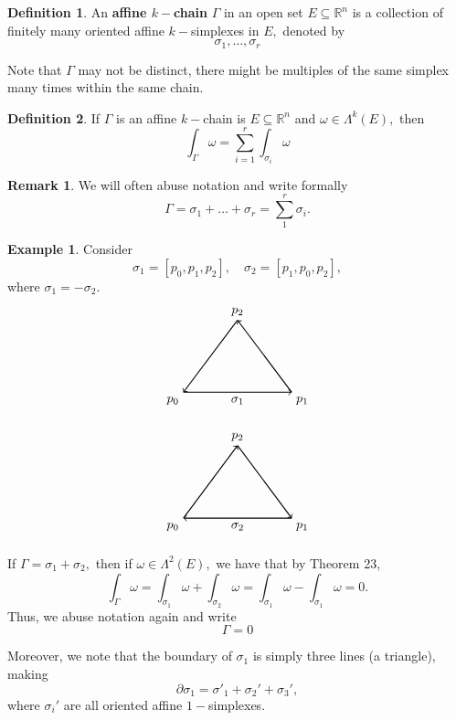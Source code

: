 \documentclass[10pt, oneside]{article}
\newcommand{\bbR}{\mathbb{R}}
\theoremstyle{definition}
\newtheorem{exmp}{Example}[section]
\newtheorem{defn}{Definition}
\newtheorem{rem}{Remark}
\begin{document}
\begin{defn}
    An \textbf{affine $k-$chain} $\Gamma$ in an open set $E\subseteq \bbR^n$ is a collection of finitely many oriented affine $k-$simplexes in $E,$ denoted by
    \[\sigma_1, \dots, \sigma_r\]
\end{defn}
Note that $\Gamma$ may not be distinct, there might be multiples of the same simplex many times within the same chain.
\begin{defn}
    If $\Gamma$ is an affine $k-$chain is $E\subseteq \bbR^n$ and $\omega \in \Lambda^k(E),$ then 
    \[\int_\Gamma \omega = \sum_{i=1}^r \int_{\sigma_i} \omega\] 
\end{defn}
\begin{rem}
    We will often abuse notation and write formally 
    \[\Gamma = \sigma_1 + \dots+ \sigma_r = \sum_{1}^r \sigma_i.\]
\end{rem}
\begin{exmp}
    Consider 
    \[\sigma_1 = [p_0, p_1, p_2], \quad \sigma_2 = [p_1, p_0, p_2],\] where $\sigma_1 = -\sigma_2.$ 
\[    \begin{tikzpicture}
    \coordinate (P0) at (0, 0);
    \coordinate (P1) at (3, 0);
    \coordinate (P2) at (1.5, 2);

    \draw[thick, ->] (P0) -- (P1) node[midway, below] {$\sigma_1$};
    \draw[thick, ->] (P1) -- (P2);
    \draw[thick, ->] (P2) -- (P0);

    \node[below left] at (P0) {$p_0$};
    \node[below right] at (P1) {$p_1$};
    \node[above] at (P2) {$p_2$};

\end{tikzpicture}\]



\[\begin{tikzpicture}
    \coordinate (P0) at (0, 0);
    \coordinate (P1) at (3, 0);
    \coordinate (P2) at (1.5, 2);

    \draw[thick, ->] (P1) -- (P0) node[midway, below] {$\sigma_2$};
    \draw[thick, ->] (P0) -- (P2);
    \draw[thick, ->] (P2) -- (P1);

    \node[below left] at (P0) {$p_0$};
    \node[below right] at (P1) {$p_1$};
    \node[above] at (P2) {$p_2$};

\end{tikzpicture}\]

If $\Gamma = \sigma_1 + \sigma_2,$ then if $\omega \in \Lambda^2(E),$ we have that by Theorem 23,
\[\int_\Gamma \omega = \int_{\sigma_1}\omega + \int_{\sigma_2}\omega = \int_{\sigma_1}\omega - \int_{\sigma_1}\omega = 0.\] Thus, we abuse notation again and write 
\[\Gamma = 0\]

Moreover, we note that the boundary of $\sigma_1$ is simply three lines (a triangle), making 
\[\partial \sigma_1 = \sigma'_1 + \sigma_2' + \sigma_3',\] where $\sigma_i'$ are all oriented affine $1-$simplexes.
\end{exmp}
\end{document}
